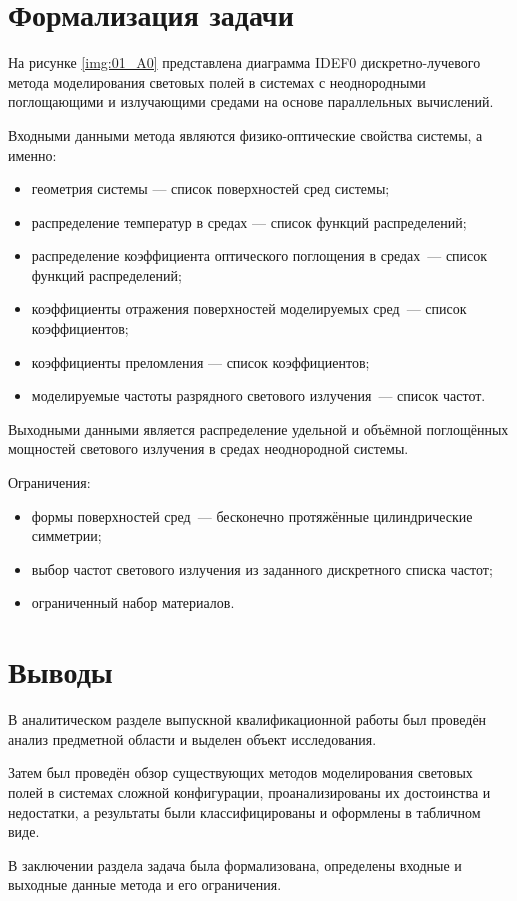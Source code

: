 \section{Формализация задачи}

На рисунке \ref{img:01_A0} представлена диаграмма IDEF0 дискретно-лучевого метода моделирования световых полей в системах с неоднородными поглощающими и излучающими средами на основе параллельных вычислений.


Входными данными метода являются физико-оптические свойства системы, а именно:
\begin{itemize}
	\item геометрия системы — список поверхностей сред системы;
	\item распределение температур в средах — список функций распределений;
	\item распределение коэффициента оптического поглощения в средах~— список функций распределений;
	\item коэффициенты отражения поверхностей моделируемых сред~— список коэффициентов;
	\item коэффициенты преломления — список коэффициентов;
	\item моделируемые частоты разрядного светового излучения~— список частот.
\end{itemize}

Выходными данными является распределение удельной и объёмной поглощённых мощностей светового излучения в средах неоднородной системы.

Ограничения:
\begin{itemize}
	\item формы поверхностей сред~— бесконечно протяжённые цилиндрические симметрии;
	\item выбор частот светового излучения из заданного дискретного списка частот;
	\item ограниченный набор материалов.
\end{itemize}

\section*{Выводы}

В аналитическом разделе выпускной квалификационной работы был проведён анализ предметной области и выделен объект исследования.

Затем был проведён обзор существующих методов моделирования световых полей в системах сложной конфигурации, проанализированы их достоинства и недостатки, а результаты были классифицированы и оформлены в табличном виде.

В заключении раздела задача была формализована, определены входные и выходные данные метода и его ограничения.
